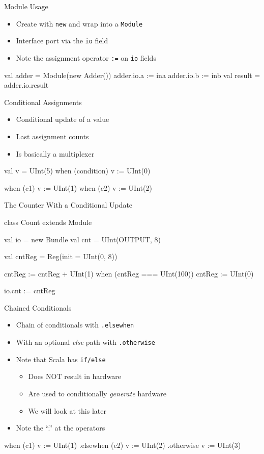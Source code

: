 \documentclass[xcolor=pdflatex,dvipsnames,table]{beamer}
\newcommand{\code}[1]{{\texttt{#1}}}
\begin{document}
\begin{frame}[fragile]{Module Usage}
\begin{itemize}
\item Create with \code{new} and wrap into a \code{Module}
\item Interface port via the \code{io} field
\item Note the assignment operator \code{:=} on \code{io} fields
\end{itemize}
\begin{chisel}
val adder = Module(new Adder())
adder.io.a := ina
adder.io.b := inb
val result = adder.io.result
\end{chisel}
\end{frame}

\begin{frame}[fragile]{Conditional Assignments}
\begin{itemize}
\item Conditional update of a value
\item Last assignment counts
\item Is basically a multiplexer
\end{itemize}
\begin{chisel}
val v = UInt(5)
when (condition) {
  v := UInt(0)
}

when (c1) { v := UInt(1) }
when (c2) { v := UInt(2) }
\end{chisel}
\end{frame}

\begin{frame}[fragile]{The Counter With a Conditional Update}
\begin{chisel}
class Count extends Module {
  val io = new Bundle {
    val cnt = UInt(OUTPUT, 8)
  }

  val cntReg = Reg(init = UInt(0, 8))

  cntReg := cntReg + UInt(1)
  when (cntReg === UInt(100)) {
    cntReg := UInt(0)
  }

  io.cnt := cntReg
}
\end{chisel}
\end{frame}

\begin{frame}[fragile]{Chained Conditionals}
\begin{itemize}
\item Chain of conditionals with \code{.elsewhen}
\item With an optional \emph{else} path with \code{.otherwise}
\item Note that Scala has \code{if/else}
\begin{itemize}
\item Does NOT result in hardware
\item Are used to conditionally \emph{generate} hardware
\item We will look at this later
\end{itemize}
\item Note the ``.'' at the operators
\end{itemize}
\begin{chisel}
when (c1) { v := UInt(1) }
.elsewhen (c2) { v := UInt(2) }
.otherwise { v := UInt(3) }
\end{chisel}
\end{frame}
\end{document}
